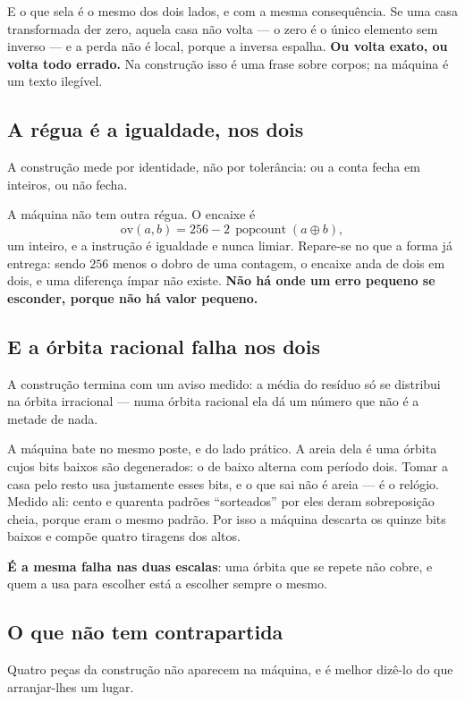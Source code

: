 \documentclass[11pt]{article}
\theoremstyle{plain}
\theoremstyle{remark}
\begin{document}
E o que sela é o mesmo dos dois lados, e com a mesma consequência. Se uma casa
transformada der zero, aquela casa não volta --- o zero é o único elemento sem
inverso --- e a perda não é local, porque a inversa espalha. \textbf{Ou volta
exato, ou volta todo errado.} Na construção isso é uma frase sobre corpos; na
máquina é um texto ilegível.

\subsection{A régua é a igualdade, nos dois}

A construção mede por identidade, não por tolerância: ou a conta fecha em
inteiros, ou não fecha.

A máquina não tem outra régua. O encaixe é
\[
\mathrm{ov}(a,b)=256-2\,\operatorname{popcount}(a\oplus b),
\]
um inteiro, e a instrução é igualdade e nunca limiar. Repare-se no que a forma
já entrega: sendo $256$ menos o dobro de uma contagem, o encaixe anda de dois em
dois, e uma diferença ímpar não existe. \textbf{Não há onde um erro pequeno se
esconder, porque não há valor pequeno.}

\subsection{E a órbita racional falha nos dois}

A construção termina com um aviso medido: a média do resíduo só se distribui na
órbita irracional --- numa órbita racional ela dá um número que não é a metade
de nada.

A máquina bate no mesmo poste, e do lado prático. A areia dela é uma órbita cujos
bits baixos são degenerados: o de baixo alterna com período dois. Tomar a casa
pelo resto usa justamente esses bits, e o que sai não é areia --- é o relógio.
Medido ali: cento e quarenta padrões ``sorteados'' por eles deram sobreposição
cheia, porque eram o mesmo padrão. Por isso a máquina descarta os quinze bits
baixos e compõe quatro tiragens dos altos.

\textbf{É a mesma falha nas duas escalas}: uma órbita que se repete não cobre, e
quem a usa para escolher está a escolher sempre o mesmo.

\subsection{O que não tem contrapartida}

Quatro peças da construção não aparecem na máquina, e é melhor dizê-lo do que
arranjar-lhes um lugar.
\end{document}
